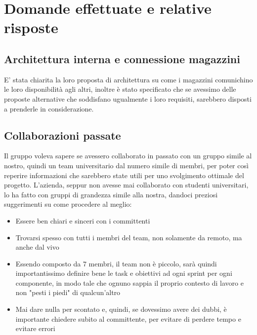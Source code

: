 \documentclass[italian, 12pt]{article}
\begin{document}
\section{Domande effettuate e relative risposte}
\subsection{Architettura interna e connessione magazzini}
E' stata chiarita la loro proposta di architettura su come i magazzini comunichino le loro disponibilità agli altri, inoltre è stato specificato che se avessimo delle proposte alternative che soddisfano ugualmente i loro requisiti, sarebbero disposti a prenderle in considerazione. 

\subsection{Collaborazioni passate}
Il gruppo voleva sapere se avessero collaborato in passato con un gruppo simile al nostro, quindi un team universitario dal numero simile di membri, per poter così reperire informazioni che sarebbero state utili per uno svolgimento ottimale del progetto. L'azienda, seppur non avesse mai collaborato con studenti universitari, lo ha fatto con gruppi di grandezza simile alla nostra, dandoci preziosi suggerimenti su come procedere al meglio:
\begin{itemize}
    \item Essere ben chiari e sinceri con i committenti
    \item Trovarsi spesso con tutti i membri del team, non solamente da remoto, ma anche dal vivo
    \item Essendo composto da 7 membri, il team non è piccolo, sarà quindi importantissimo definire bene le task e obiettivi ad ogni sprint per ogni componente, in modo tale che ognuno sappia il proprio contesto di lavoro e non "pesti i piedi" di qualcun'altro
    \item Mai dare nulla per scontato e, quindi, se dovessimo avere dei dubbi, è importante chiedere subito al committente, per evitare di perdere tempo e evitare errori
\end{itemize}
\end{document}
